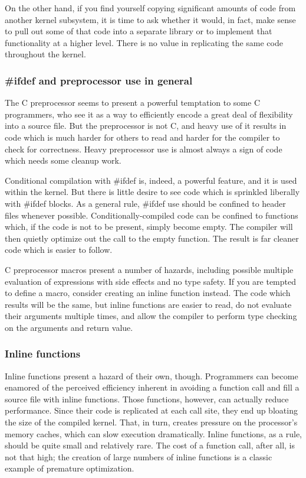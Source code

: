 \documentclass[a4paper,8pt,english]{sphinxmanual}
\begin{document}
On the other hand, if you find yourself copying significant amounts of code
from another kernel subsystem, it is time to ask whether it would, in fact,
make sense to pull out some of that code into a separate library or to
implement that functionality at a higher level.  There is no value in
replicating the same code throughout the kernel.


\subsubsection{\#ifdef and preprocessor use in general}
\label{process/4.Coding:ifdef-and-preprocessor-use-in-general}
The C preprocessor seems to present a powerful temptation to some C
programmers, who see it as a way to efficiently encode a great deal of
flexibility into a source file.  But the preprocessor is not C, and heavy
use of it results in code which is much harder for others to read and
harder for the compiler to check for correctness.  Heavy preprocessor use
is almost always a sign of code which needs some cleanup work.

Conditional compilation with \#ifdef is, indeed, a powerful feature, and it
is used within the kernel.  But there is little desire to see code which is
sprinkled liberally with \#ifdef blocks.  As a general rule, \#ifdef use
should be confined to header files whenever possible.
Conditionally-compiled code can be confined to functions which, if the code
is not to be present, simply become empty.  The compiler will then quietly
optimize out the call to the empty function.  The result is far cleaner
code which is easier to follow.

C preprocessor macros present a number of hazards, including possible
multiple evaluation of expressions with side effects and no type safety.
If you are tempted to define a macro, consider creating an inline function
instead.  The code which results will be the same, but inline functions are
easier to read, do not evaluate their arguments multiple times, and allow
the compiler to perform type checking on the arguments and return value.


\subsubsection{Inline functions}
\label{process/4.Coding:inline-functions}
Inline functions present a hazard of their own, though.  Programmers can
become enamored of the perceived efficiency inherent in avoiding a function
call and fill a source file with inline functions.  Those functions,
however, can actually reduce performance.  Since their code is replicated
at each call site, they end up bloating the size of the compiled kernel.
That, in turn, creates pressure on the processor's memory caches, which can
slow execution dramatically.  Inline functions, as a rule, should be quite
small and relatively rare.  The cost of a function call, after all, is not
that high; the creation of large numbers of inline functions is a classic
example of premature optimization.
\end{document}
